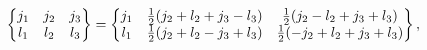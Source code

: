 \[\begin{Bmatrix}j_{1}&j_{2}&j_{3}\\
l_{1}&l_{2}&l_{3}\end{Bmatrix}=\begin{Bmatrix}j_{1}&\frac{1}{2}(j_{2}+l_{2}+j_%
{3}-l_{3})&\frac{1}{2}(j_{2}-l_{2}+j_{3}+l_{3})\\
l_{1}&\frac{1}{2}(j_{2}+l_{2}-j_{3}+l_{3})&\frac{1}{2}(-j_{2}+l_{2}+j_{3}+l_{3%
})\end{Bmatrix},\]